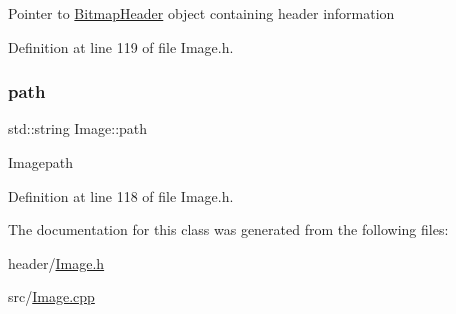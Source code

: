 Pointer to \mbox{\hyperlink{classBitmapHeader}{Bitmap\+Header}} object containing header information 

Definition at line 119 of file Image.\+h.

\mbox{\label{classImage_aec8a33f176362d146da8c058798ebbff}} 
\subsubsection{\texorpdfstring{path}{path}}
{\footnotesize\ttfamily std\+::string Image\+::path\hspace{0.3cm}{\ttfamily [private]}}

Imagepath 

Definition at line 118 of file Image.\+h.



The documentation for this class was generated from the following files\+:\begin{DoxyCompactItemize}
\item 
header/\mbox{\hyperlink{Image_8h}{Image.\+h}}\item 
src/\mbox{\hyperlink{Image_8cpp}{Image.\+cpp}}\end{DoxyCompactItemize}
